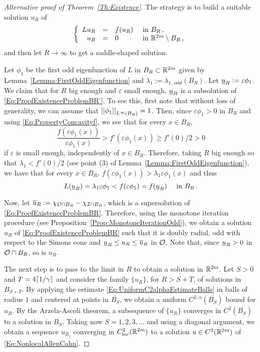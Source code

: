 \begin{proof}[Alternative proof of Theorem~\ref{Th:Existence}]
The strategy is to build a suitable solution $u_R$ of 
\begin{equation}
\label{Eq:ProofExistenceProblemBR'}
	\left\{\begin{array}{rcll}
	L u_R &=& f(u_R) & \textrm{ in } B_R\,,\\
	u_R &=& 0 & \textrm{ in }\mathbb{R}^{2m} \setminus B_R\,,
	\end{array} \right.
\end{equation}
and then let $R\to \infty$ to get a saddle-shaped solution.

Let $\phi_1$ be the first odd eigenfunction of $L$ in $B_R \subset \mathbb{R}^{2m}$ given by Lemma~\ref{Lemma:FirstOddEigenfunction} and $\lambda_1 := \lambda_{1, \, \mathrm{odd}}(B_R)$. Let $\underline{u}_R := \varepsilon \phi_1$. We claim that for $R$ big enough and $\varepsilon$ small enough, $\underline{u}_R$ is a subsolution of \eqref{Eq:ProofExistenceProblemBR'}. To see this, first note that without loss of generality, we can assume that $\left | \left |{\phi_1} \right | \right |_{L^\infty(B_R)}=1$. Then, since $\varepsilon \phi_1>0$ in $B_R$ and using \eqref{Eq:PropertyConcavityf}, we see that for every $x\in B_R$,
$$
\dfrac{f(\varepsilon \phi_1(x))}{\varepsilon \phi_1(x)} > f'(\varepsilon \phi_1(x)) \geq f'(0)/2 > 0
$$
if $\varepsilon$ is small enough, independently of $x\in B_R$. Therefore, taking $R$ big enough so that $\lambda_1 < f'(0)/2$ (see point (3) of Lemma~\ref{Lemma:FirstOddEigenfunction}), we have that for every $x\in B_R$,  $f(\varepsilon \phi_1(x)) > \lambda_1 \varepsilon \phi_1(x)$ and thus
$$
L(\underline{u}_R) = \lambda_1 \varepsilon \phi_1 < f(\varepsilon \phi_1) = f(\underline{u}_R) \quad \textrm{ in } B_R\,.
$$

Now, let $\overline{u}_R := \chi_{\mathcal{O} \cap B_R} - \chi_{\mathcal{I} \cap B_R}$, which is a supersolution of \eqref{Eq:ProofExistenceProblemBR}. Therefore, using the monotone iteration procedure (see Proposition~\ref{Prop:MonotoneIterationOdd}), we obtain a solution $u_R$ of \eqref{Eq:ProofExistenceProblemBR} such that it is doubly radial, odd with respect to the Simons cone and $\underline{u}_R \leq u_R \leq \overline{u}_R$ in $\mathcal{O}$. Note that, since $\underline{u}_R > 0$ in $\mathcal{O} \cap B_R$, so is $u_R$.

The next step is to pass to the limit in $R$ to obtain a solution in $\mathbb{R}^{2m}$. Let $S>0$ and $T =4\lceil 1/\gamma\rceil$ and consider the family $\{u_R\}$, for $R> S + T$, of solutions in $B_{S+T}$. By applying the estimate \eqref{Eq:UniformC2alphaEstimateBalls} in balls of radius $1$ and centered at points in $\overline{B_{S}}$, we obtain a uniform $C^{2,\alpha}(\overline{B_S})$ bound for $u_R$. By the Arzela-Ascoli theorem, a subsequence of $\{u_R\}$ converges in $C^2(\overline{B_S})$ to a solution in $B_S$. Taking now $S = 1,2,3,\ldots$ and using a diagonal argument, we obtain a sequence $u_{R_j}$ converging in $C^2_{\mathrm{loc}}(\mathbb{R}^{2m})$ to a solution $u \in C^2(\mathbb{R}^{2m})$ of \eqref{Eq:NonlocalAllenCahn}.


\end{proof}

